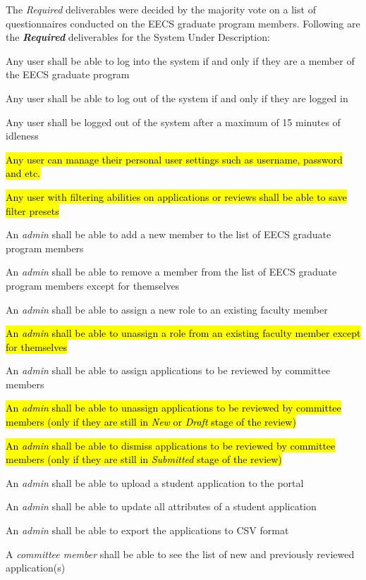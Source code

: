\documentclass[fontsize=12pt,paper=letter,twoside]{scrartcl}
\begin{document}
The \emph{Required} deliverables were decided by the majority vote on a list of questionnaires conducted on the EECS graduate program members. Following are the \textbf{\emph{Required}} deliverables for the System Under Description:\\

\begin{mylist}
\item Any user shall be able to log into the system if and only if they are a member of the EECS graduate program
\item Any user shall be able to log out of the system if and only if they are logged in
\item Any user shall be logged out of the system after a maximum of 15 minutes of idleness
\item \hl{Any user can manage their personal user settings such as username, password and etc.}
\item \hl{Any user with filtering abilities on applications or reviews shall be able to save filter presets}
\item An \emph{admin} shall be able to add a new member to the list of EECS graduate program members
\item An \emph{admin} shall be able to remove a member from the list of EECS graduate program members except for themselves
\item An \emph{admin} shall be able to assign a new role to an existing faculty member
\item \hl{An \emph{admin} shall be able to unassign a role from an existing faculty member except for themselves}
\item An \emph{admin} shall be able to assign applications to be reviewed by committee members
\item \hl{An \emph{admin} shall be able to unassign applications to be reviewed by committee members (only if they are still in \emph{New} or \emph{Draft} stage of the review)}
\item \hl{An \emph{admin} shall be able to dismiss applications to be reviewed by committee members (only if they are still in \emph{Submitted} stage of the review)}
\item An \emph{admin} shall be able to upload a student application to the portal
\item An \emph{admin} shall be able to update all attributes of a student application
\item An \emph{admin} shall be able to export the applications to CSV format
\item A \emph{committee member} shall be able to see the list of new and previously reviewed application(s)

\end{mylist}
\end{document}
